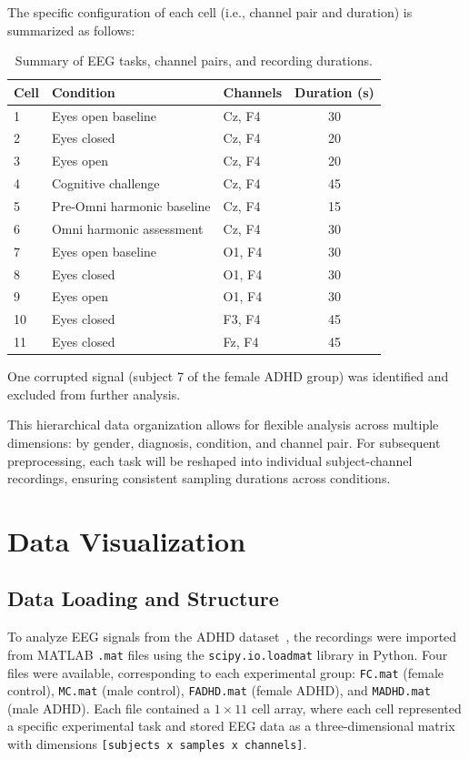 \documentclass[11pt,a4paper]{article}
\begin{document}
The specific configuration of each cell (i.e., channel pair and duration) is summarized as follows:

\begin{table}[h!]
\centering
\begin{tabular}{lllc}
\toprule
\textbf{Cell} & \textbf{Condition} & \textbf{Channels} & \textbf{Duration (s)} \\
\midrule
1 & Eyes open baseline & Cz, F4 & 30 \\
2 & Eyes closed & Cz, F4 & 20 \\
3 & Eyes open & Cz, F4 & 20 \\
4 & Cognitive challenge & Cz, F4 & 45 \\
5 & Pre-Omni harmonic baseline & Cz, F4 & 15 \\
6 & Omni harmonic assessment & Cz, F4 & 30 \\
7 & Eyes open baseline & O1, F4 & 30 \\
8 & Eyes closed & O1, F4 & 30 \\
9 & Eyes open & O1, F4 & 30 \\
10 & Eyes closed & F3, F4 & 45 \\
11 & Eyes closed & Fz, F4 & 45 \\
\bottomrule
\end{tabular}
\caption{Summary of EEG tasks, channel pairs, and recording durations.}
\label{tab:tasks}
\end{table}

One corrupted signal (subject 7 of the female ADHD group) was identified and excluded from further analysis. 

\vspace{0.3cm}
\noindent This hierarchical data organization allows for flexible analysis across multiple dimensions: by gender, diagnosis, condition, and 
channel pair. For subsequent preprocessing, each task will be reshaped into individual subject-channel recordings, ensuring consistent 
sampling durations across conditions.


\section{Data Visualization}\label{sec:visualization}
\subsection{Data Loading and Structure}
To analyze EEG signals from the ADHD dataset~\cite{dataset}, the recordings were imported from MATLAB \texttt{.mat} files using the 
\texttt{scipy.io.loadmat} library in Python. Four files were available, corresponding to each experimental group:
\texttt{FC.mat} (female control), \texttt{MC.mat} (male control), \texttt{FADHD.mat} (female ADHD), and \texttt{MADHD.mat} (male ADHD). 
Each file contained a $1\times11$ cell array, where each cell represented a specific experimental task and stored EEG data as a 
three-dimensional matrix with dimensions \texttt{[subjects x samples x channels]}.
\end{document}
